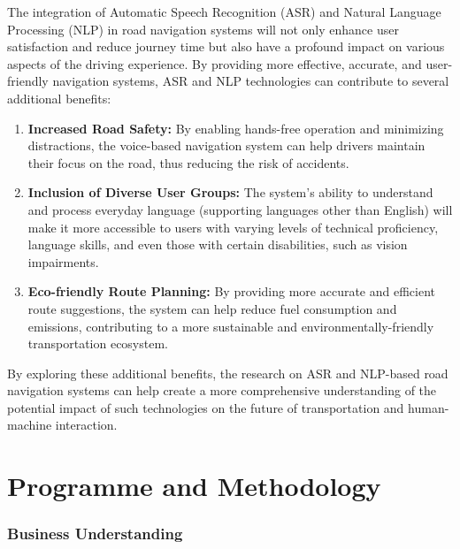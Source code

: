 \documentclass{epsrc}
\begin{document}
The integration of Automatic Speech Recognition (ASR) and Natural Language Processing (NLP) in road navigation systems will not only enhance user satisfaction and reduce journey time but also have a profound impact on various aspects of the driving experience. By providing more effective, accurate, and user-friendly navigation systems, ASR and NLP technologies can contribute to several additional benefits:
\vspace{5pt}
\begin{enumerate}
    \item \textbf{Increased Road Safety:} By enabling hands-free operation and minimizing distractions, the voice-based navigation system can help drivers maintain their focus on the road, thus reducing the risk of accidents.
    \item \textbf{Inclusion of Diverse User Groups:} The system's ability to understand and process everyday language (supporting languages other than English) will make it more accessible to users with varying levels of technical proficiency, language skills, and even those with certain disabilities, such as vision impairments.
    \item \textbf{Eco-friendly Route Planning:} By providing more accurate and efficient route suggestions, the system can help reduce fuel consumption and emissions, contributing to a more sustainable and environmentally-friendly transportation ecosystem.
\end{enumerate}
\vspace{5pt}

By exploring these additional benefits, the research on ASR and NLP-based road navigation systems can help create a more comprehensive understanding of the potential impact of such technologies on the future of transportation and human-machine interaction.

\part{Programme and Methodology}
\vspace{5pt}

\section{Business Understanding}
\vspace{5pt}
\end{document}
